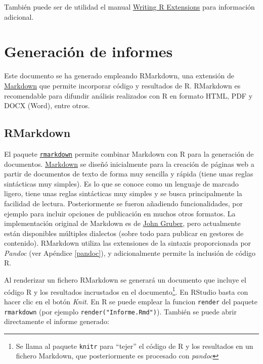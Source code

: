 \documentclass[
]{book}
\theoremstyle{break}
\theoremstyle{nonumberplain}
\begin{document}
También puede ser de utilidad el manual \href{http://colinfay.me/writing-r-extensions}{Writing R Extensions} para información adicional.

\hypertarget{informes}{%
\chapter{Generación de informes}\label{informes}}

Este documento se ha generado empleando RMarkdown, una extensión de \href{https://es.wikipedia.org/wiki/Markdown}{Markdown} que permite incorporar código y resultados de R.
RMarkdown es recomendable para difundir análisis realizados con R en formato HTML, PDF y DOCX (Word), entre otros.

\hypertarget{rmarkdown}{%
\section{RMarkdown}\label{rmarkdown}}

El paquete \href{https://github.com/rstudio/rmarkdown}{\texttt{rmarkdown}} permite combinar Markdown con R para la generación de documentos. \href{http://daringfireball.net/projects/markdown/}{Markdown} se diseñó inicialmente para la creación de páginas web a partir de documentos de texto de forma muy sencilla y rápida (tiene unas reglas sintácticas muy simples).
Es lo que se conoce como un lenguaje de marcado ligero, tiene unas reglas sintácticas muy simples y se busca principalmente la facilidad de lectura.
Posteriormente se fueron añadiendo funcionalidades, por ejemplo para incluir opciones de publicación en muchos otros formatos.
La implementación original de Markdown es de \href{http://daringfireball.net/projects/markdown/}{John Gruber},
pero actualmente están disponibles múltiples dialectos (sobre todo para publicar en gestores de contenido).
RMarkdown utiliza las extensiones de la sintaxis proporcionada por \emph{Pandoc} (ver Apéndice \ref{pandoc}), y adicionalmente permite la inclusión de código R.

Al renderizar un fichero RMarkdown se generará un documento que incluye el código R y los resultados incrustados en el documento\footnote{Se llama al paquete \texttt{knitr} para ``tejer'' el código de R y los resultados en un fichero Markdown, que posteriormente es procesado con \emph{pandoc}}.
En RStudio basta con hacer clic en el botón \emph{Knit}.
En R se puede emplear la funcion \texttt{render} del paquete \texttt{rmarkdown} (por ejemplo \texttt{render("Informe.Rmd")}).
También se puede abrir directamente el informe generado:
\end{document}

